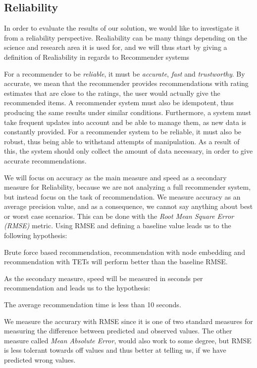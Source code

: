 \subsection{Reliability}\label{Subsec:Reliability_definition}

In order to evaluate the results of our solution, we would like to investigate it from a reliability perspective.
Realiability can be many things depending on the science and research area it is used for, and we will thus start by giving a definition of Realiability in regards to Recommender systems

For a recommender to be \textit{reliable}, it must be \textit{accurate}, \textit{fast} and \textit{trustworthy}.
By accurate, we mean that the recommender provides recommendations with rating estimates that are close to the ratings, the user would actually give the recommended items.
A recommender system must also be idempotent, thus producing the same results under similar conditions. Furthermore, a system must take frequent updates into account and be able to manage them, as new data is constantly provided.
For a recommender system to be reliable, it must also be robust, thus being able to withstand attempts of manipulation. As a result of this, the system should only collect the amount of data necessary, in order to give accurate recommendations.

We will focus on accuracy as the main measure and speed as a secondary measure for Reliability, because we are not analyzing a full recommender system, but instead focus on the task of recommendation.
We measure accuracy as an average precision value, and as a consequence, we cannot say anything about best or worst case scenarios. This can be done with the \textit{Root Mean Square Error (RMSE)} metric. Using RMSE and defining a baseline value leads us to the following hypothesis:

\begin{hypothesis}\label{RMSE_hypothesis}
  Brute force based recommendation, recommendation with node embedding and recommendation with TETs will perform better than the baseline RMSE.
\end{hypothesis}

As the secondary measure, speed will be measured in seconds per recommendation and leads us to the hypothesis:
\begin{hypothesis}\label{Speed_hypothesis}
  The average recommendation time is less than 10 seconds.
\end{hypothesis}

We measure the accurary with RMSE since it is one of two standard measures for measuring the difference between predicted and observed values. The other measure called \textit{Mean Absolute Error}, would also work to some degree, but RMSE is less tolerant towards off values and thus better at telling us, if we have predicted wrong values.
